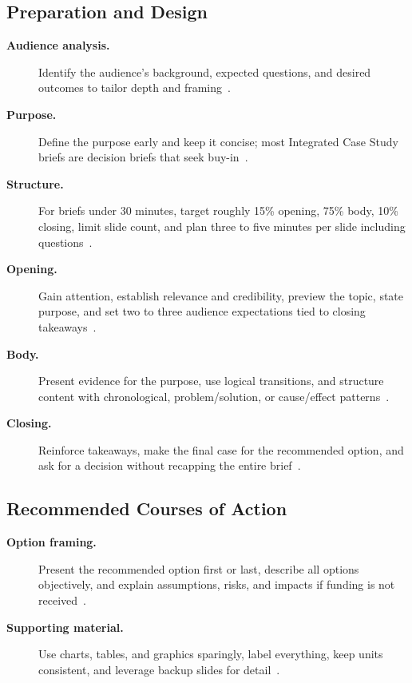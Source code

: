 \documentclass[../main.tex]{subfiles}
\begin{document}
\subsection{Preparation and Design}
\begin{description}
  \item[\textbf{Audience analysis.}] Identify the audience's background, expected questions, and desired outcomes to tailor depth and framing~\autocite{edo-5-1-4-presentation-techniques-2025}.
  \item[\textbf{Purpose.}] Define the purpose early and keep it concise; most Integrated Case Study briefs are decision briefs that seek buy-in~\autocite{edo-5-1-4-presentation-techniques-2025}.
  \item[\textbf{Structure.}] For briefs under 30 minutes, target roughly 15\% opening, 75\% body, 10\% closing, limit slide count, and plan three to five minutes per slide including questions~\autocite{edo-5-1-4-presentation-techniques-2025}.
  \item[\textbf{Opening.}] Gain attention, establish relevance and credibility, preview the topic, state purpose, and set two to three audience expectations tied to closing takeaways~\autocite{edo-5-1-4-presentation-techniques-2025}.
  \item[\textbf{Body.}] Present evidence for the purpose, use logical transitions, and structure content with chronological, problem/solution, or cause/effect patterns~\autocite{edo-5-1-4-presentation-techniques-2025}.
  \item[\textbf{Closing.}] Reinforce takeaways, make the final case for the recommended option, and ask for a decision without recapping the entire brief~\autocite{edo-5-1-4-presentation-techniques-2025}.
\end{description}

\subsection{Recommended Courses of Action}
\begin{description}
  \item[\textbf{Option framing.}] Present the recommended option first or last, describe all options objectively, and explain assumptions, risks, and impacts if funding is not received~\autocite{edo-5-1-4-presentation-techniques-2025}.
  \item[\textbf{Supporting material.}] Use charts, tables, and graphics sparingly, label everything, keep units consistent, and leverage backup slides for detail~\autocite{edo-5-1-4-presentation-techniques-2025}.
\end{description}
\end{document}
